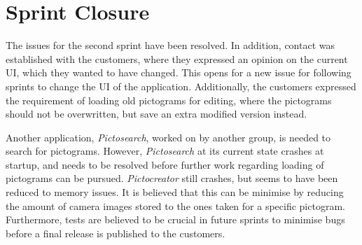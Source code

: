 \section{Sprint Closure}
The issues for the second sprint have been resolved.
In addition, contact was established with the customers, where they expressed an opinion on the current UI, which they wanted to have changed.
This opens for a new issue for following sprints to change the UI of the application.
Additionally, the customers expressed the requirement of loading old pictograms for editing, where the pictograms should not be overwritten, but save an extra modified version instead.

Another application, \textit{Pictosearch}, worked on by another group, is needed to search for pictograms.
However, \textit{Pictosearch} at its current state crashes at startup, and needs to be resolved before further work regarding loading of pictograms can be pursued.
\textit{Pictocreator} still crashes, but seems to have been reduced to memory issues.
It is believed that this can be minimise by reducing the amount of camera images stored to the ones taken for a specific pictogram.
Furthermore, tests are believed to be crucial in future sprints to minimise bugs before a final release is published to the customers.